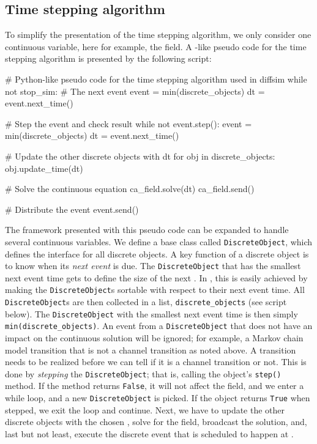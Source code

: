 \subsection{Time stepping algorithm}

\label{sec:hake:event-driven-simulator}
To simplify the presentation of the time stepping algorithm, we only
consider one continuous variable, here for example, the \Ca field. A
-like pseudo code for the time stepping algorithm
is presented by the following script:
\begin{python}
# Python-like pseudo code for the time stepping algorithm used in diffsim
while not stop_sim:
    # The next event
    event = min(discrete_objects)
    dt = event.next_time()

    # Step the event and check result
    while not event.step():
        event = min(discrete_objects)
        dt = event.next_time()

    # Update the other discrete objects with dt
    for obj in discrete_objects:
        obj.update_time(dt)

    # Solve the continuous equation
    ca_field.solve(dt)
    ca_field.send()

    # Distribute the event
    event.send()
\end{python}
The framework presented with this pseudo code can be expanded to
handle several continuous variables. We define a base class called
\texttt{DiscreteObject}, which defines the interface for all discrete
objects. A key function of a discrete object is to know when its
\textit{next event} is due. The \texttt{DiscreteObject} that has the
smallest next event time gets to define the size of the next \Dt. In
, this is easily achieved by making the
\texttt{DiscreteObject}s sortable with respect to their next event
time. All \texttt{DiscreteObject}s are then collected in a list,
\texttt{discrete\_objects} (see script below). The
\texttt{DiscreteObject} with the smallest next event time is then
simply \texttt{min(discrete\_objects)}. An event from a
\texttt{DiscreteObject} that does not have an impact on the continuous
solution will be ignored; for example, a Markov chain model transition
that is not a channel transition as noted above. A transition needs to
be realized before we can tell if it is a channel transition or
not. This is done by \textit{stepping} the \texttt{DiscreteObject};
that is, calling the object's \texttt{step()} method. If the method
returns \texttt{False}, it will not affect the \Ca field, and we enter
a while loop, and a new \texttt{DiscreteObject} is picked. If the
object returns \texttt{True} when stepped, we exit the loop and
continue. Next, we have to update the other discrete objects with the
chosen \Dt, solve for the \Ca field, broadcast the solution, and, last
but not least, execute the discrete event that is scheduled to happen
at \Dt.


